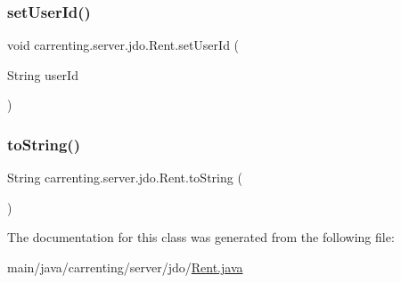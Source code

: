 \mbox{\label{classcarrenting_1_1server_1_1jdo_1_1_rent_aa8754262fbafe71067360b137ea41335}} 
\subsubsection{\texorpdfstring{setUserId()}{setUserId()}}
{\footnotesize\ttfamily void carrenting.\+server.\+jdo.\+Rent.\+set\+User\+Id (\begin{DoxyParamCaption}\item[{String}]{user\+Id }\end{DoxyParamCaption})}

\mbox{\label{classcarrenting_1_1server_1_1jdo_1_1_rent_a0b24f3a2451eebba996054aaca563f36}} 
\subsubsection{\texorpdfstring{toString()}{toString()}}
{\footnotesize\ttfamily String carrenting.\+server.\+jdo.\+Rent.\+to\+String (\begin{DoxyParamCaption}{ }\end{DoxyParamCaption})}



The documentation for this class was generated from the following file\+:\begin{DoxyCompactItemize}
\item 
main/java/carrenting/server/jdo/\mbox{\hyperlink{_rent_8java}{Rent.\+java}}\end{DoxyCompactItemize}
